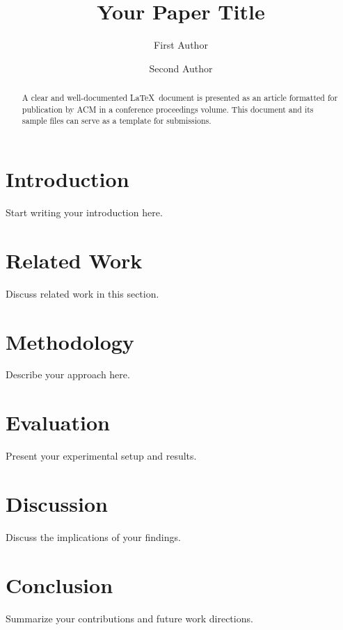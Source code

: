 \documentclass[sigconf]{acmart}
\begin{document}
\title{Your Paper Title}

\author{First Author}

\author{Second Author}

\begin{abstract}
  A clear and well-documented \LaTeX\ document is presented as an
  article formatted for publication by ACM in a conference proceedings
  volume. This document and its sample files can serve as a template
  for submissions.
\end{abstract}


\maketitle

\section{Introduction}
Start writing your introduction here.

\section{Related Work}
Discuss related work in this section.

\section{Methodology}
Describe your approach here.

\section{Evaluation}
Present your experimental setup and results.

\section{Discussion}
Discuss the implications of your findings.

\section{Conclusion}
Summarize your contributions and future work directions.



\end{document}
